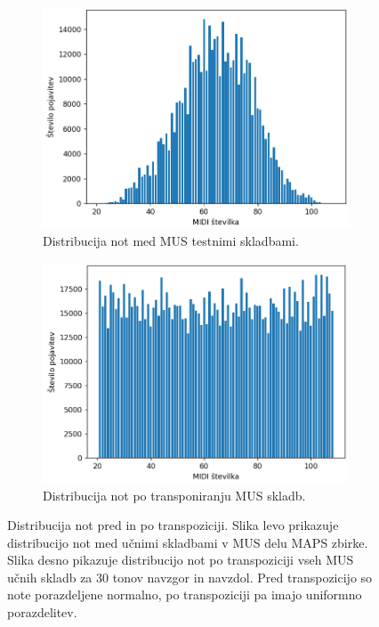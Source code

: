 \documentclass[a4paper, 12pt, openright]{book}
\begin{document}
\begin{figure}
    \centering
    \begin{subfigure}{.45\textwidth}
        \centering
        \includegraphics[width=\linewidth]{notes.png}
        \caption{Distribucija not med MUS testnimi skladbami.}
        \label{fig:before}
    \end{subfigure}%
    \hspace{1em}%
    \begin{subfigure}{.45\textwidth}
        \centering
        \includegraphics[width=\linewidth]{notes_transposed.png}
        \caption{Distribucija not po transponiranju MUS skladb.}
        \label{fig:after}
    \end{subfigure}
    \caption{Distribucija not pred in po transpoziciji. Slika levo prikazuje distribucijo not med učnimi skladbami v MUS delu MAPS zbirke. Slika desno pikazuje distribucijo not po transpoziciji vseh MUS učnih skladb za 30 tonov navzgor in navzdol. Pred transpozicijo so note porazdeljene normalno, po transpoziciji pa imajo uniformno porazdelitev.}
    \label{fig:note_dist}
\end{figure}
\end{document}
